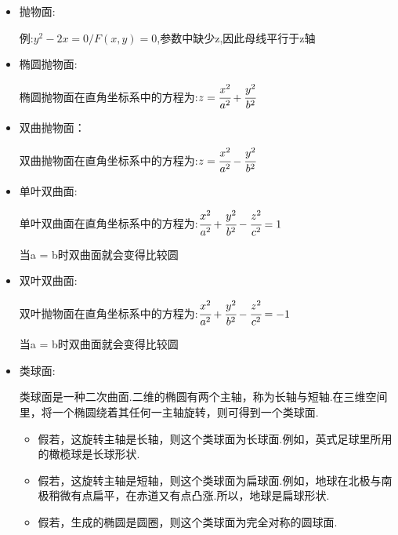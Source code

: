 \documentclass[UTF8,12pt]{ctexbook}
\begin{document}
{{{{\begin{itemize}
{\begin{itemize}
{                      点(a,0,0)、(0,b,0)和(0,0,c)都在曲面上.从原点到这三个点的线段,称为椭球的半主轴.它们与椭圆的半长轴和半短轴相对应.

                      体积公式为:$\cfrac{4}{3}\pi abc$.

                      注意,当三个半径都相等时,这个公式便化为球的体积;两个半径相等时,便化为扁球面或长球面的体积.
                      }
                \item {
                      抛物面:

                      例:$y^2 - 2x = 0 / F(x,y) = 0$,参数中缺少z,因此母线平行于z轴
                      }
                \item {
                      椭圆抛物面:

                      椭圆抛物面在直角坐标系中的方程为:$z = \cfrac{x^2}{a^2} + \cfrac{y^2}{b^2}$
                      }
                \item {
                      双曲抛物面：

                      双曲抛物面在直角坐标系中的方程为:$z = \cfrac{x^2}{a^2} - \cfrac{y^2}{b^2}$
                      }
                \item {
                      单叶双曲面:

                      单叶双曲面在直角坐标系中的方程为:$\cfrac{x^2}{a^2} + \cfrac{y^2}{b^2} - \cfrac{z^2}{c^2} = 1$

                      当a = b时双曲面就会变得比较圆
                      }
                \item {
                      双叶双曲面:

                      双叶抛物面在直角坐标系中的方程为:$\cfrac{x^2}{a^2} + \cfrac{y^2}{b^2} - \cfrac{z^2}{c^2} = -1$

                      当a = b时双曲面就会变得比较圆
                      }
                \item {
                      类球面:

                      类球面是一种二次曲面.二维的椭圆有两个主轴，称为长轴与短轴.在三维空间里，将一个椭圆绕着其任何一主轴旋转，则可得到一个类球面.

                      \begin{itemize}
                        \item 假若，这旋转主轴是长轴，则这个类球面为长球面.例如，英式足球里所用的橄榄球是长球形状.
                        \item 假若，这旋转主轴是短轴，则这个类球面为扁球面.例如，地球在北极与南极稍微有点扁平，在赤道又有点凸涨.所以，地球是扁球形状.
                        \item  假若，生成的椭圆是圆圈，则这个类球面为完全对称的圆球面.
                      \end{itemize}

}
\end{itemize}}
\end{itemize}}}}}
\end{document}
